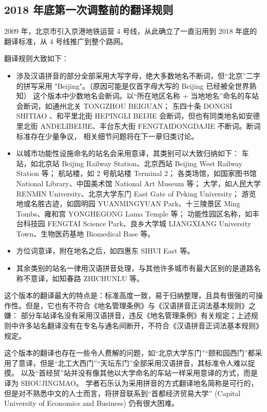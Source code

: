 \documentclass[a4paper,UTF8,12pt]{ctexart}
\begin{document}
    \subsection{2018 年底第一次调整前的翻译规则}
        2009 年，北京市引入京港地铁运营 4 号线，从此确立了一直沿用到 2018 年底的翻译标准，从 4 号线推广到整个路网。

        翻译规则大致如下：
        \begin{itemize}
            \item 涉及汉语拼音的部分全部采用大写字母，绝大多数地名不断词，但“北京”二字的拼写采用 "Beijing"。（原因可能是仅首字母大写的 Beijing 已经被全世界熟知）
                \subitem 这个版本中少数地名会断词。以“所在地区名称 + 当地地名”命名的车站会断词，如通州北关 TONGZHOU BEIGUAN；
                东四十条 DONGSI SHITIAO 、和平里北街 HEPINGLI BEIJIE 会断词，但也有同类地名如安德里北街 ANDELIBEIJIE、丰台东大街 FENGTAIDONGDAJIE 不断词。断词标准存在少量争议，
                相关细节问题将在下一章归类讨论。
            \item 以城市功能性设施命名的站名会采用意译，其类别可以大致归纳如下：
                \subitem 车站，如北京站 Beijing Railway Station、北京西站 Beijing West Railway Station 等；
                \subitem 航站楼，如 2 号航站楼 Terminal 2；
                \subitem 各类场馆，如国家图书馆 National Library、中国美术馆 National Art Museum 等；
                \subitem 大学，如人民大学 RENMIN University、北京大学东门 East Gate of Peking University；
                \subitem 游览地或名胜古迹，如圆明园 YUANMINGYUAN Park、十三陵景区 Ming Tombs、雍和宫 YONGHEGONG Lama Temple 等；
                \subitem 功能性园区名称，如丰台科技园 FENGTAI Science Park、良乡大学城 LIANGXIANG University Town、生物医药基地 Biomedical Base 等。
            \item 方位词意译，附在地名之后，如四惠东 SIHUI East 等。
            \item 其余类别的站名一律用汉语拼音处理，与其他许多城市有最大区别的是道路名称不意译，如知春路 ZHICHUNLU 等。
        \end{itemize}
        
        这个版本的翻译最大的特点是：标准高度一致，易于归纳整理，且具有很强的可操作性。但是，它也有不符合《地名管理条例》与《汉语拼音正词法基本规则》之嫌：
        部分车站译名没有采用汉语拼音，违反《地名管理条例》有关规定；上述规则中许多站名翻译没有在专名与通名间断开，不符合《汉语拼音正词法基本规则》规定。

        这个版本的翻译也存在一些令人费解的问题，如“北京大学东门”“颐和园西门”都采用了意译，但是“北工大西门”“天坛东门”全部采用汉语拼音，其标准令人难以捉摸。
        以及“首经贸”站并没有像其他以大学命名的车站一样采用意译的方式，而是译为 SHOUJINGMAO。
        学者石乐认为采用拼音的方式翻译地名简称是可行的，但是对不熟悉中文的人士而言，将拼音联系到“首都经济贸易大学” (Capital University of Economics and Business) 仍有很大困难。\cite{ref10}
\end{document}
